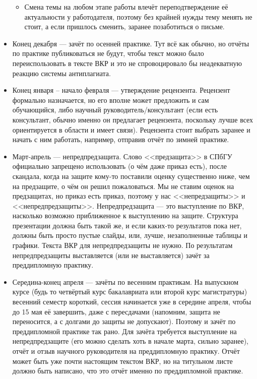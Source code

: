 \documentclass{article}
\begin{document}
\begin{itemize}
    \begin{itemize}
        \item Смена темы на любом этапе работы влечёт переподтверждение её актуальности у работодателя, поэтому без крайней нужды тему менять не стоит, а если пришлось сменить, заранее позаботиться о письме.
    \end{itemize}
    \item Конец декабря --- зачёт по осенней практике. Тут всё как обычно, но отчёты по практике публиковаться не будут, чтобы текст можно было переиспользовать в тексте ВКР и это не спровоцировало бы неадекватную реакцию системы антиплагиата.
    \item Конец января -- начало февраля --- утверждение рецензента. Рецензент формально назначается, но его вполне может предложить и сам обучающийся, либо научный руководитель/консультант (если есть консультант, обычно именно он предлагает рецензента, поскольку лучше всех ориентируется в области и имеет связи). Рецензента стоит выбрать заранее и начать с ним работать, например, отправив отчёт по зимней практике.
    \item Март-апрель --- непредпредзащита. Слово <<предзащита>> в СПбГУ официально запрещено использовать (о чём даже приказ есть), после скандала, когда на защите кому-то поставили оценку существенно ниже, чем на предзащите, о чём он решил пожаловаться. Мы не ставим оценок на предзащитах, но приказ есть приказ, поэтому у нас <<непредзащиты>> и <<непредпредзащиты>>. Непредпредзащита --- это выступление по ВКР, насколько возможно приближенное к выступлению на защите. Структура презентации должна быть такой же, и если каких-то результатов пока нет, должны быть просто пустые слайды, или, лучше, незаполненные таблицы и графики. Текста ВКР для непредпредзащиты не нужно. По результатам непредпредзащиты выставляется (или не выставляется) зачёт за преддипломную практику.
    \item Середина-конец апреля --- зачёты по весенним практикам. На выпускном курсе (будь то четвёртый курс бакалавриата или второй курс магистратуры) весенний семестр короткий, сессия начинается уже в середине апреля, чтобы до 15 мая её завершить, даже с пересдачами (напомним, защита не переносится, а с долгами до защиты не допускают). Поэтому и зачёт по преддипломной практике так рано. Для зачёта требуется выступление на непредпредзащите (его можно сделать хоть в начале марта, сильно заранее), отчёт и отзыв научного руководителя на преддипломную практику. Отчёт может быть уже почти настоящим текстом ВКР, но на титульном листе должно быть написано, что это отчёт именно по преддипломной практике.

\end{itemize}
\end{document}
